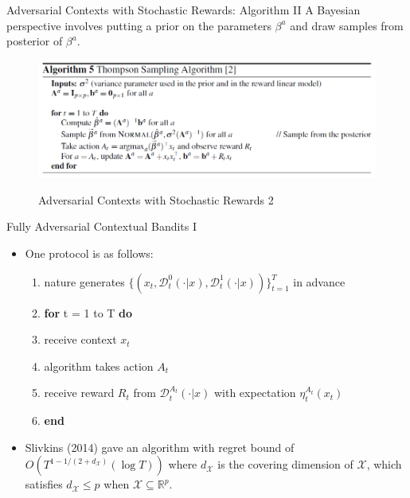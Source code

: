 \documentclass[english]{article}
\begin{document}
\item {Adversarial Contexts with Stochastic Rewards: Algorithm II}
    A Bayesian perspective involves putting a prior on the parameters $\beta^a$ and draw samples from posterior of $\beta^a$. 
    \begin{figure}
        \centering
        \includegraphics[scale = 0.5]{Alg_4.PNG}
        \label{Adversarial Contexts with Stochastic Rewards 2}
        \caption{Adversarial Contexts with Stochastic Rewards 2}
    \end{figure}


\item {Fully Adversarial Contextual Bandits I}
\begin{itemize}
    \item 
One protocol is as follows:
\begin{enumerate}
    \item nature generates $\{(x_t, \mathcal{D}_t^0(\cdot | x), \mathcal{D}_t^1(\cdot | x))\}_{t = 1}^T$ in advance
    \item \textbf{for} t = 1 to T \textbf{do}
    \item \quad receive context $x_t$
    \item \quad algorithm takes action $A_t$
    \item \quad receive reward $R_t$ from $\mathcal{D}_t^{A_t}(\cdot | x)$ with expectation $\eta_t^{A_t}(x_t)$
    \item \textbf{end}
\end{enumerate}
\item 
Slivkins (2014) gave an algorithm with regret bound of $O(T^{1 - 1/(2+d_\mathcal{X})}(\log T) )$ where $d_\mathcal{X}$ is the covering dimension of $\mathcal{X}$, which satisfies $d_\mathcal{X} \leq p$ when $\mathcal{X} \subseteq \mathbb{R} ^p$.
\end{itemize}
\end{document}
